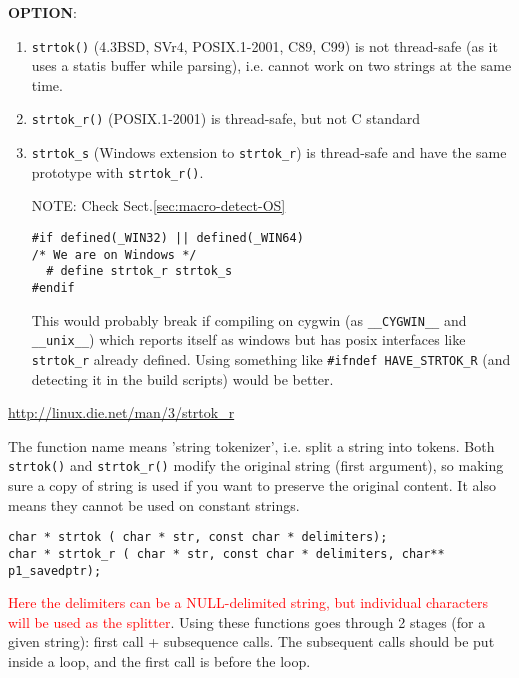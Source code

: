 {\bf OPTION}:
\begin{enumerate}
  \item \verb!strtok()! (4.3BSD, SVr4, POSIX.1-2001, C89, C99) is not
  thread-safe (as it uses a statis buffer while parsing), i.e.
  cannot work on two strings at the same time. 
  
  \item \verb!strtok_r()! (POSIX.1-2001) is thread-safe, but not C standard
  
  \item \verb!strtok_s! (Windows extension to \verb!strtok_r!) is thread-safe
  and have the same prototype with \verb!strtok_r()!.

NOTE: Check Sect.\ref{sec:macro-detect-OS}
\begin{verbatim}
#if defined(_WIN32) || defined(_WIN64)
/* We are on Windows */
  # define strtok_r strtok_s
#endif
\end{verbatim}
This would probably break if compiling on cygwin (as \verb!__CYGWIN__! and
\verb!__unix__!) which reports itself as windows but has posix interfaces like
\verb!strtok_r! already defined. Using something like \verb!#ifndef HAVE_STRTOK_R! (and detecting it in the build scripts) would be better.

\end{enumerate}
\url{http://linux.die.net/man/3/strtok_r}  

\begin{mdframed}
The function name means 'string tokenizer', i.e. split a string into tokens.
  Both \verb!strtok()! and \verb!strtok_r()! modify the original string (first
  argument), so making sure a copy of string is used if you want to preserve the
  original content.   It also means they cannot be used on constant strings.
  

\end{mdframed}

\begin{verbatim}
char * strtok ( char * str, const char * delimiters);
char * strtok_r ( char * str, const char * delimiters, char** p1_savedptr);
\end{verbatim}
\textcolor{red}{Here the delimiters can be a NULL-delimited string, but
individual characters will be used as the splitter}. 
Using these functions goes through 2 stages (for a given string): first call +
subsequence calls. The subsequent calls should be put inside a loop, and the
first call is before the loop.

